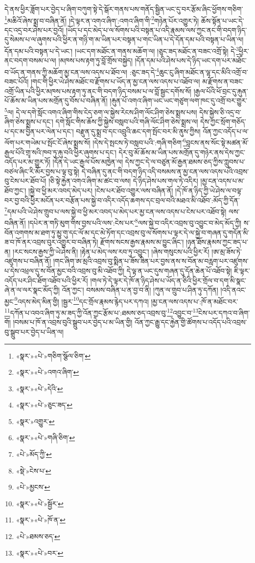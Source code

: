 དེ་ནས་ཕྱིར་ཟློག་པར་བྱེད་པ་ཞིག་བཀུག་སྟེ་དེ་སྒོར་གནས་པས་གནོད་སྦྱིན་ཡང་དུ་བར་རྩོམ་ཞིང་ཕྱོགས་གཅིག་\footnote{«སྣར་»«པེ་»གཅིག་སྩོལ་ཅིག་}མཆིའོ་ཞེས་སྨྲ་བ་བཞིན་ནོ། །དེ་ལྟར་ན་འགའ་ཞིག་:འགའ་ཞིག་གི་\footnote{«སྣར་»«པེ་»འགའ་ཞིག་}གཉེན་པོར་འགྱུར་ཏེ། ཆོས་སྟོན་པ་ཡང་དེ་དང་འདྲ་བར་ཤེས་པར་བྱའོ། །ཡོད་པ་དང་མེད་པ་ལ་སོགས་པའི་བསྟན་པ་འདི་རྣམས་ལས་ཀྱང་ནང་གི་བདག་ཉིད་དུ་སེམས་པ་ལ་ཞུགས་པའི་ཕྱིར་ན་གཉི་ག་མ་ཡིན་པར་བསྟན་པ་གང་ཡིན་པ་དེ་དོན་དམ་པའི་བསྟན་པ་ཡིན་ལ། དོན་དམ་པའི་བསྟན་པ་དེ་ཡང་། །ཡང་དག་མཐོང་ན་གནས་མཆོག་ལ། །ཅུང་ཟད་མཐོང་ན་བཟང་འགྲོ་སྟེ། དེ་\footnote{«སྣར་»«པེ་»དེའི་}ཕྱིར་ནང་བདག་བསམ་པ་ལ། །མཁས་པས་རྟག་ཏུ་བློ་གྲོས་བསྐྱེད། །དོན་དམ་པའི་ཤེས་པས་དེ་ཉིད་ཡང་དག་པར་མཐོང་བ་ཡོད་ན་གནས་ཀྱི་མཆོག་མྱ་ངན་ལས་འདས་པ་ཐོབ་ལ། :ཅུང་ཟད་དེ་\footnote{«སྣར་»«པེ་»ཅུང་ཟད་}ཆུང་ངུ་ཞིག་མཐོང་ན་ལྷ་དང་མིའི་འགྲོ་བ་བཟང་པོའོ། །གང་གི་ཕྱིར་ཡེ་ཤེས་མཐོང་བ་རྫོགས་པ་ཡོད་ན་མྱ་ངན་ལས་འདས་པ་འཐོབ་ལ། མ་རྫོགས་ན་བཟང་འགྲོ་ཡིན་པའི་ཕྱིར་མཁས་པས་རྟག་ཏུ་ནང་གི་བདག་ཉིད་བསམ་པ་ལ་བློ་སྦྱང་དགོས་སོ། །རྒྱལ་པོའི་ཕོ་བྲང་དུ་རྐུན་པོ་ཆོས་མ་ཡིན་པས་མགྲོན་དུ་བོས་པ་བཞིན་ནོ། །རྐུན་པོ་འགའ་ཞིག་ཡང་ཡང་གཙུག་ལག་ཁང་དུ་འགྲོ་བར་གྱུར་\footnote{«སྣར་»འགྱུར་}ལ། དེ་ལ་དགེ་སློང་འགའ་ཞིག་གིས་ངེད་ཅག་ལ་སྐྱེས་རེངས་ཤིག་ལོང་ཤིག་ཅེས་སྨྲས་པས། དེས་སྐྱེས་ཅི་འདྲ་བ་ཞིག་ཅེས་སྨྲས་པ་དང་། དགེ་སློང་གིས་ཆོས་ཀྱི་སྐྱེས་བསླབ་པའི་གཞི་ལོང་ཤིག་ཅེས་སྨྲས་ལ། དེས་ཀྱང་སྲོག་གཅོད་པ་དང་མ་བྱིན་པར་ལེན་པ་དང་། བརྫུན་དུ་སྨྲ་བ་དང་འབྲུའི་ཆང་དག་སྤོང་བར་མི་ནུས་ཀྱིས། འོན་ཀྱང་འདོད་པ་ལ་ལོག་པར་གཡེམ་པ་སྤོང་ངོ་ཞེས་སྨྲས་སོ། །དེས་དེ་སྤངས་ཏེ་བསླབ་པའི་:གཞི་གཅིག་\footnote{«སྣར་»«པེ་»གཞི་ཅིག་}བླངས་ནས་སོང་སྟེ་མཚན་མོ་རྒྱལ་པོའི་གྲྭ་སའི་ཁབ་ཏུ་རྐུ་བའི་ཕྱིར་ཞུགས་པ་དང་། དེར་བུ་མོ་ཆོས་མ་ཡིན་པས་མགྲོན་དུ་གཉེར་ནས་དེས་ཀྱང་འདོད་པར་མ་གྱུར་ཏོ། །དོན་དེ་ཡང་རྒྱལ་པོས་མཁྱེན་ལ། དེས་ཀྱང་དེ་ལ་བཙུན་མོ་རྒྱན་ཐམས་ཅད་ཀྱིས་ཀླུབས་པ་བཙལ་ཞིང་རི་མོར་བྱས་པ་ལྟ་བུ་སྟེ། དེ་བཞིན་དུ་ནང་གི་བདག་ཉིད་འདི་བསམས་ན་མྱ་ངན་ལས་འདས་པའི་འབྲས་བུ་ངེས་པར་ཐོབ་པོ། །ཅི་སྟེ་རྐྱེན་འགའ་ཞིག་མ་ཚང་བ་ལས། དེ་ཉིད་ཤེས་པས་གལ་ཏེ་འདིར། །མྱ་ངན་འདས་པ་མ་ཐོབ་ཀྱང་། །སྐྱེ་བ་ཕྱི་མར་འབད་མེད་པར། །ངེས་པར་ཐོབ་འགྱུར་ལས་བཞིན་ནོ། །དེ་ཁོ་ན་ཉིད་ཀྱི་ཡེ་ཤེས་ལ་བལྟ་བར་བྱ་བའི་ཕྱིར་མངོན་པར་བརྩོན་པས་སྐྱེ་བ་འདིར་འདོད་ཆགས་དང་བྲལ་བའི་མཐའ་མི་འཐོབ་:མོད་ཀྱི་དོན་\footnote{«པེ་»མོད་ཀྱི་}དམ་པའི་ཡེ་ཤེས་གྲུབ་པ་ལས་སྐྱེ་བ་ཕྱི་མར་འབད་པ་མེད་པར་མྱ་ངན་ལས་འདས་པ་ངེས་པར་འཐོབ་སྟེ། ལས་བཞིན་ནོ། །དཔེར་ན་གཏི་མུག་གིས་བྱས་པའི་ལས་:ངེས་པར་\footnote{«སྡེ་»ངེས་པ་}ལས་སྐྱེ་བ་འདིར་འབྲས་བུ་འབྱུང་བ་མེད་མོད་ཀྱི། ས་བོན་འགགས་མ་ཐག་ཏུ་མྱུ་གུ་དང་ལོ་མ་དང་མེ་ཏོག་དང་འབྲས་བུ་ལ་སོགས་པ་ལྟར་དེ་ལ་སྐྱེ་བ་གཞན་དུ་གདོན་མི་ཟ་བ་ཁོ་ནར་འབྲས་བུར་འགྱུར་བ་བཞིན་ཏེ། རྫོགས་སངས་རྒྱས་རྣམས་མ་བྱུང་ཞིང་། །ཉན་ཐོས་རྣམས་ཀྱང་ཟད་པ་ན། །རང་སངས་རྒྱས་ཀྱི་ཡེ་ཤེས་ནི། །རྟེན་པ་མེད་ལས་རབ་ཏུ་འབྱུང་། །ཞེས་གསུངས་པའི་ཕྱིར་རོ། །ཨ་མྲ་ཟོས་ཏེ་འཛུགས་པ་བཞིན་ནོ། །གང་ཞིག་ཨ་མྲའི་འབྲས་བུ་སྨིན་པ་ཟོས་ཟིན་པར་བྱས་ནས་ས་བོན་མ་བརླག་པར་འཛུགས་པ་དེས་འཕྲལ་དུ་ས་བོན་མྱང་བའི་འབྲས་བུ་མི་འཐོབ་ཀྱི། དེ་ལྟ་ན་ཡང་དུས་གཞན་དུ་དོན་ཆེན་པོ་འཐོབ་སྟེ། ཇི་ལྟར་འདོད་པར་ཤིང་ཐོག་འཐོབ་པའི་ཕྱིར་རོ། །གལ་ཏེ་དེ་ལྟར་དེ་ཁོ་ན་ཉིད་ཤེས་པ་ཡོད་ན་ཅིའི་ཕྱིར་གྲོལ་བ་དག་མི་སྣང་ཞེ་ན་ལ་ལར་སྣང་མོད་ཀྱི། འོན་ཀྱང་། བསམས་བཞིན་པ་ན་བྱ་བ་ནི། །ཀུན་ལ་གྲུབ་པ་ཤིན་ཏུ་དཀོན། །འདི་ནའང་མྱང་\footnote{«པེ་»མྱངས་}འདས་མེད་མིན་གྱི། །སྦྱར་\footnote{«སྣར་»«པེ་»སྦྱོར་}དང་གྲོལ་རྣམས་རྙེད་པར་དཀའ། །མྱ་ངན་ལས་འདས་པ་:ཁོ་ན་མཐོང་བར་\footnote{«སྣར་»«པེ་»ཁོ་ན་}དཀོན་པ་འབའ་ཞིག་ཏུ་མ་ཟད་ཀྱི་འོན་ཀྱང་རྩོམ་པ་:ཐམས་ཅད་འབྲས་བུ་\footnote{«པེ་»ཐམས་ཅད་}འབྱུང་བ་\footnote{«སྣར་»«པེ་»བར་}ངེས་པར་དཀའ་བ་ཞིག་གོ། །བསམ་པ་ཁོ་ན་འབྲས་བུའི་སྒྲུབ་པར་བྱེད་པ་མ་ཡིན་གྱི། འོན་ཀྱང་རྒྱུ་དང་རྐྱེན་གྱི་ཚོགས་པ་འདོད་པའི་འབྲས་བུ་སྒྲུབ་པར་བྱེད་པ་ཡིན་ལ། 